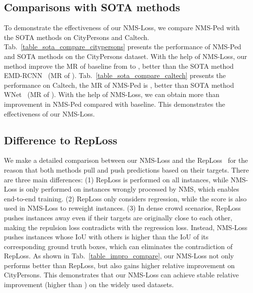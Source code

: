 \documentclass[sigconf]{acmart}
\begin{document}
\subsection{Comparisons with SOTA methods}
To demonstrate the effectiveness of our NMS-Loss, we compare NMS-Ped with the SOTA methods on CityPersons and Caltech.
Tab.~\ref{table_sota_compare_citypersons} presents the performance of NMS-Ped and SOTA methods on the CityPersons dataset. With the help of NMS-Loss, our method improve the MR of baseline from  to , better than the SOTA method EMD-RCNN~\cite{chu2020detection} (MR of ). Tab.~\ref{table_sota_compare_caltech} presents the performance on Caltech, the MR of NMS-Ped is , better than SOTA method WNet~\cite{luo2020whether} (MR of ). With the help of NMS-Loss, we can obtain more than  improvement in NMS-Ped compared with baseline. This demonstrates the effectiveness of our NMS-Loss.

\subsection{Difference to RepLoss}
We make a detailed comparison between our NMS-Loss and the RepLoss~\cite{wang2018repulsion} for the reason that both methods pull and push predictions based on their targets. There are three main differences:
(1) RepLoss is performed on all instances, while NMS-Loss is only performed on instances wrongly processed by NMS, which enables end-to-end training.
(2) RepLoss only considers regression, while the score is also used in NMS-Loss to reweight instances.
(3) In dense crowd scenarios, RepLoss pushes instances away even if their targets are originally close to each other, making the repulsion loss contradicts with the regression loss.
Instead, NMS-Loss pushes instances whose IoU with others is higher than the IoU of its corresponding ground truth boxes, which can eliminates the contradiction of RepLoss. As shown in Tab.~\ref{table_impro_compare}, our NMS-Loss not only performs better than RepLoss, but also gains higher relative improvement on CityPersons. This demonstrates that our NMS-Loss can achieve stable relative improvement (higher than ) on the widely used datasets.
\end{document}
